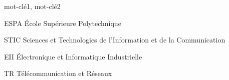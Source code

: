 \documentclass[a4paper, oneside, 12pt, memoireMaitrise, francais, creativecommons, hyperref]{memoESPA}
\begin{document}

\maketitle

\presentjury

\begin{avantpropos}

\lipsum[1] %

\end{avantpropos}



\begin{remerciements}

\lipsum[1] %


\end{remerciements}



\begin{sommaire}{mot-clé1, mot-clé2}

\lipsum[1] %

\end{sommaire}


\begin{abstract}{Titre en anglais}{keyword1, keyword2}

\lipsum[1] %

\end{abstract}


\tableofcontents


\listoftables


\listoffigures


\begin{listofabbr}[3cm]
\item [ESPA] École Supérieure Polytechnique
\item [STIC] Sciences et Technologies de l’Information et de la Communication
\item [EII] Électronique et Informatique Industrielle
\item [TR] Télécommunication et Réseaux
\end{listofabbr}
\end{document}
